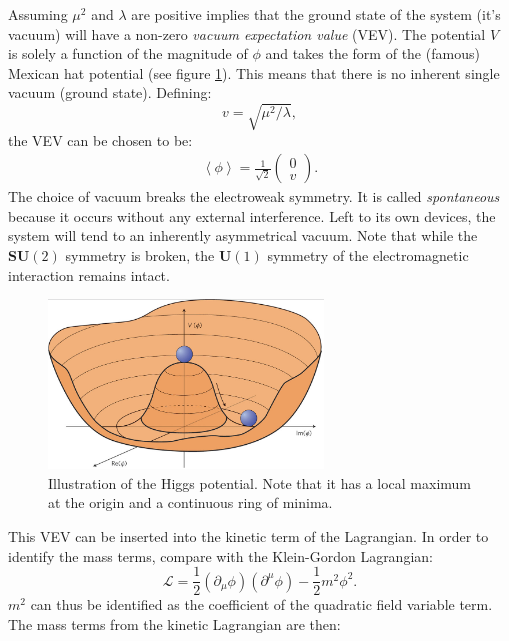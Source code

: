 Assuming $\mu^{2}$ and $\lambda$ are positive implies that the ground state of the system (it's vacuum) will have a non-zero \emph{vacuum expectation value} (VEV). The potential $V$ is solely a function of the magnitude of $\phi$ and takes the form of the (famous) Mexican hat potential (see figure \ref{mexican_hat}). This means that there is no inherent single vacuum (ground state). Defining:
\begin{equation}
v = \sqrt{\mu^{2}/\lambda},
\end{equation}
the VEV can be chosen to be:
\begin{eqnarray}
\left< \phi \right> = \frac{1}{\sqrt{2}}
	\begin{pmatrix}
	0 \\
	v
	\end{pmatrix}.
\end{eqnarray}
The choice of vacuum breaks the electroweak symmetry. It is called \emph{spontaneous} because it occurs without any external interference. Left to its own devices, the system will tend to an inherently asymmetrical vacuum. Note that while the $\mathbf{SU}(2)$ symmetry is broken, the $\mathbf{U}(1)$ symmetry of the electromagnetic interaction remains intact.
\begin{figure}
\centering
\includegraphics[width=0.65\textwidth]{images/higgs_potential.png}
\caption{Illustration of the Higgs potential. Note that it has a local maximum at the origin and a continuous ring of minima. \cite{mexican_hat}}
\label{mexican_hat}
\end{figure}
This VEV can be inserted into the kinetic term of the Lagrangian. In order to identify the mass terms, compare with the Klein-Gordon Lagrangian:
\begin{equation}
\mathcal{L} = \frac{1}{2} \left( \partial_{\mu} \phi \right) \left( \partial^{\mu} \phi \right) - \frac{1}{2}m^{2}\phi^{2}.
\end{equation}
$m^{2}$ can thus be identified as the coefficient of the quadratic field variable term. The mass terms from the kinetic Lagrangian are then:
